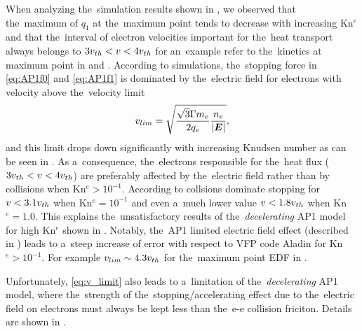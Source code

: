 When analyzing the~simulation results shown in , 
we observed that 
the~maximum of $q_1$ at the~maximum point tends to decrease with increasing 
Kn$^e$ and that the~interval of electron velocities important for 
the~heat transport always belongs to $3 v_{th} < v <4 v_{th}$ for an~example
refer to the~kinetics at maximum point in  
and . 
According to simulations,
the~stopping force in \eqref{eq:AP1f0} and \eqref{eq:AP1f1} is dominated by
the~electric field for electrons with velocity above the~velocity limit
\begin{equation}
  v_{lim} = \sqrt{\frac{\sqrt{3}\Gamma m_e}{2q_e}\frac{n_e}{|\boldsymbol{E}|}}
  ,
  \label{eq:v_limit}
\end{equation}
and this limit drops 
down significantly with increasing Knudsen number as can be seen 
in . 
As a~consequence, the~electrons responsible for the~heat flux
($3 v_{th} < v <4 v_{th}$) are preferably affected by the~electric field
rather than by collisions when Kn$^{e} > 10^{-1}$. According to 
 collsions dominate stopping for $v < 3.1 v_{th}$ 
when Kn$^e = 10^{-1}$ and even a~much lower value $v < 1.8 v_{th}$ 
when Kn$^e = 1.0$. This explains the~unsatisfactory results of 
the~\textit{decelerating} AP1
model for high Kn$^e$ shown in . 
Notably, the~AP1 limited electric field effect (described in 
) leads to a~steep increase of error with respect 
to VFP code Aladin for Kn$^e > 10^{-1}$. 
For example $v_{lim}\sim 4.3v_{th}$ for the~maximum point EDF in 
.

Unfortunately, \eqref{eq:v_limit} also leads to a~limitation of 
the~\textit{decelerating} AP1 model, where the~strength of the~stopping/accelerating effect due to the~electric field on electrons must always 
be kept less than the~e-e collision friciton. Details are shown 
in .

